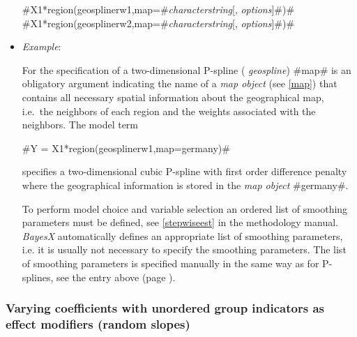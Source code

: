 \begin{itemize}
#X1*region(geosplinerw1,map=#{\em characterstring}[, {\em options}]#)# \\
#X1*region(geosplinerw2,map=#{\em characterstring}[, {\em options}]#)#
\item[] {\em Example}:

For the specification of a two-dimensional P-spline ({\em
geospline}) #map# is an obligatory argument indicating the name of
a {\em map object} (see \autoref{map}) that contains all necessary
spatial information about the geographical map, i.e.~the neighbors
of each region and the weights associated with the neighbors. The
model term

#Y = X1*region(geosplinerw1,map=germany)#

specifies a two-dimensional cubic P-spline with first order
difference penalty where the geographical information is stored in the
{\em map object} #germany#.

To perform model choice and variable selection an ordered list of smoothing parameters must be defined, see
\autoref{stepwiseest} in the methodology manual. {\em BayesX} automatically defines an appropriate list of smoothing
parameters, i.e. it is usually not necessary to  specify the smoothing parameters. The list of smoothing parameters is
specified manually in the same way as for P-splines, see the entry above (page \pageref{psplines_stepwise}).
\end{itemize}



\subsubsection*{Varying coefficients with unordered group indicators
as effect modifiers (random slopes)}

